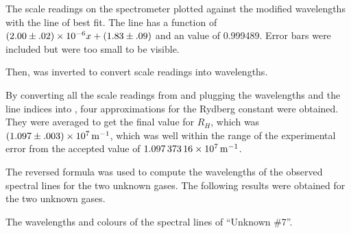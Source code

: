 \begin{paper}
{The scale readings on the spectrometer plotted against the modified
wavelengths with the line of best fit.
The line has a function of $(2.00\pm.02)\times\SI{E-6}{}x+(1.83\pm.09)$ and an
 value of 0.999489.
Error bars were included but were too small to be visible.}

Then, \eqHartmann was inverted to convert scale readings into wavelengths.


By converting all the scale readings from \figHydrogen and plugging the
wavelengths and the line indices into \eqRydberg, four approximations
for the Rydberg constant were obtained.
They were averaged to get the final value for $R_H$, which was
$(1.097\pm.003)\times\SI{E7}{\per\meter}$, which was well within the range of the
experimental error from the accepted value of $\SI{1.09737316E7}{\per\meter}$.

The reversed formula was used to compute the wavelengths of the observed
spectral lines for the two unknown gases.
The following results were obtained for the two unknown gases.

{The wavelengths and colours of the spectral lines of ``Unknown \#7''.}\vspace{1em}


\end{paper}
